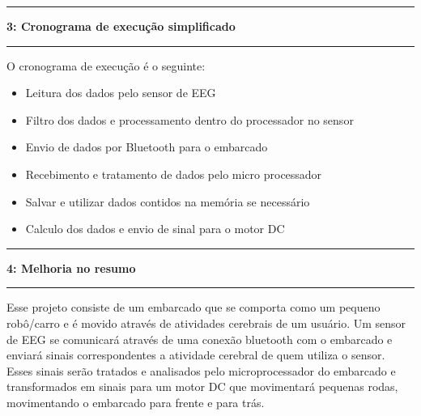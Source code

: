 \documentclass[11pt]{article}
\newcommand\question[2]{\vspace{.25in}\hrule\textbf{#1: #2}\vspace{.5em}\hrule\vspace{.10in}}
\begin{document}
\raggedright
\question{3}{Cronograma de execução simplificado}

O cronograma de execução é o seguinte:

\begin{itemize}
	\item Leitura dos dados pelo sensor de EEG
	\item Filtro dos dados e processamento dentro do processador no sensor
	\item Envio de dados por Bluetooth para o embarcado
	\item Recebimento e tratamento de dados pelo micro processador
	\item Salvar e utilizar dados contidos na memória se necessário
	\item Calculo dos dados e envio de sinal para o motor DC
\end{itemize}

\raggedright
\question{4}{Melhoria no resumo}

\RaggedRight

Esse projeto consiste de um embarcado que se comporta como um pequeno robô/carro e é movido através de atividades cerebrais de um usuário. Um sensor de EEG se comunicará através de uma conexão bluetooth com o embarcado e enviará sinais correspondentes a atividade cerebral de quem utiliza o sensor. Esses sinais serão tratados e analisados pelo microprocessador do embarcado e transformados em sinais para um motor DC que movimentará pequenas rodas, movimentando o embarcado para frente e para trás.

{}

\end{document}
